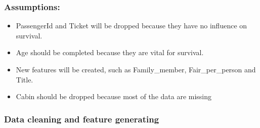 \documentclass[11pt]{article}
\providecommand{\tightlist}{%
      \setlength{\itemsep}{0pt}\setlength{\parskip}{0pt}}
\begin{document}
    \subsubsection{Assumptions:}\label{assumptions}

\begin{itemize}
\tightlist
\item
  PassengerId and Ticket will be dropped because they have no influence
  on survival.
\item
  Age should be completed because they are vital for survival.
\item
  New features will be created, such as Family\_member,
  Fair\_per\_person and Title.
\item
  Cabin should be dropped because most of the data are missing
\end{itemize}

    \subsubsection{Data cleaning and feature
generating}\label{data-cleaning-and-feature-generating}
\end{document}
